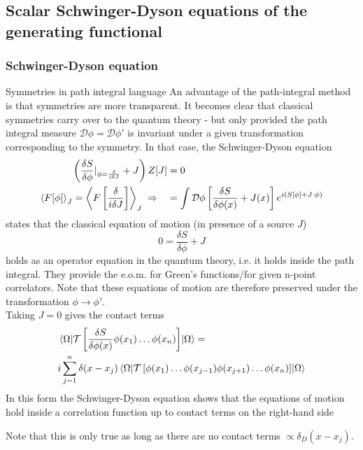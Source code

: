 \subsection{Scalar Schwinger-Dyson equations of the generating functional}
\subsubsection{Schwinger-Dyson equation}
\begin{mybox}{Symmetries in path integral language}
	An advantage of the path-integral method is that symmetries are more transparent. It becomes clear that classical symmetries carry over to the quantum theory -  but only provided the path integral measure $\mathcal{D}\phi =\mathcal{D}\phi'$ is invariant under a given transformation corresponding to the symmetry. In that case, the Schwinger-Dyson equation
	\begin{align}
		\label{eq:schwingerdyson}
		\left(\frac{\delta S}{\delta \phi} |_{\phi=\frac{\delta}{i \delta J}} + J\right) Z[J] &= 0\\
		\expval{F[\phi]}_J=\expval{F\left[\frac{\delta}{i\delta J}\right]}_J \; \Rightarrow \quad &= \int \mathcal{D}\phi \left[\frac{\delta S}{\delta \phi(x)} + J(x) \right] e^{i\left(S[\phi] + J \cdot \phi \right)}
	\end{align}
states that the classical equation of motion (in presence of a source $J$)
\begin{equation}
	0 = \frac{\delta S}{\delta \phi} + J
\end{equation}
holds as an operator equation in the quantum theory, i.e. it holds inside the path integral. They provide the e.o.m. for Green's functions/for given n-point correlators. Note that these equations of motion are therefore preserved under the transformation $\phi \rightarrow\phi'$.\\
Taking $J=0$ gives the contact terms
\begin{align}
	\label{eq:contacttermsSchwingerdyson}
	&\expval{\mathcal{T}\left[\frac{\delta S}{\delta \phi(x)} \phi(x_1) \dots \phi(x_n)\right]}{\Omega} = \\
	&i\sum_{j=1}^{n} \delta(x-x_j) \expval{\mathcal{T}\left[\phi(x_1)\dots \phi(x_{j-1}) \phi(x_{j+1}) \dots \phi(x_n)\right]}{\Omega} \nonumber
\end{align}
In this form the Schwinger-Dyson equation shows that the equations of motion hold inside a correlation function up to contact terms on the right-hand side
\end{mybox}
Note that this is only true as long as there are no contact terms $\propto \delta_D(x-x_j)$.\\

